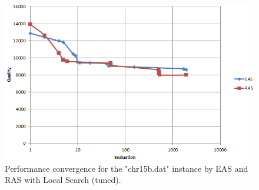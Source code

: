\documentclass[12pt]{article}
\begin{document}
\begin{figure}[H]
  \centering
    \includegraphics[scale=0.56]{ls-tuned.PNG}
  \caption{Performance convergence for the "chr15b.dat" instance by EAS and RAS with Local Search (tuned).}
  \label{fig:convergence-ls-tuned}
\end{figure}
\end{document}
